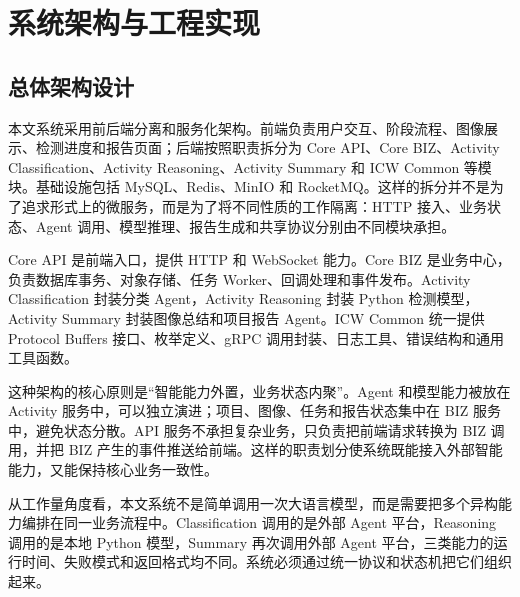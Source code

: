 \chapter{系统架构与工程实现}
\label{chap:architecture-implementation}

\section{总体架构设计}
\label{sec:impl-overall-architecture}

本文系统采用前后端分离和服务化架构。前端负责用户交互、阶段流程、图像展示、检测进度和报告页面；后端按照职责拆分为 Core API、Core BIZ、Activity Classification、Activity Reasoning、Activity Summary 和 ICW Common 等模块。基础设施包括 MySQL、Redis、MinIO 和 RocketMQ。这样的拆分并不是为了追求形式上的微服务，而是为了将不同性质的工作隔离：HTTP 接入、业务状态、Agent 调用、模型推理、报告生成和共享协议分别由不同模块承担。

Core API 是前端入口，提供 HTTP 和 WebSocket 能力。Core BIZ 是业务中心，负责数据库事务、对象存储、任务 Worker、回调处理和事件发布。Activity Classification 封装分类 Agent，Activity Reasoning 封装 Python 检测模型，Activity Summary 封装图像总结和项目报告 Agent。ICW Common 统一提供 Protocol Buffers 接口、枚举定义、gRPC 调用封装、日志工具、错误结构和通用工具函数。

这种架构的核心原则是“智能能力外置，业务状态内聚”。Agent 和模型能力被放在 Activity 服务中，可以独立演进；项目、图像、任务和报告状态集中在 BIZ 服务中，避免状态分散。API 服务不承担复杂业务，只负责把前端请求转换为 BIZ 调用，并把 BIZ 产生的事件推送给前端。这样的职责划分使系统既能接入外部智能能力，又能保持核心业务一致性。

从工作量角度看，本文系统不是简单调用一次大语言模型，而是需要把多个异构能力编排在同一业务流程中。Classification 调用的是外部 Agent 平台，Reasoning 调用的是本地 Python 模型，Summary 再次调用外部 Agent 平台，三类能力的运行时间、失败模式和返回格式均不同。系统必须通过统一协议和状态机把它们组织起来。

